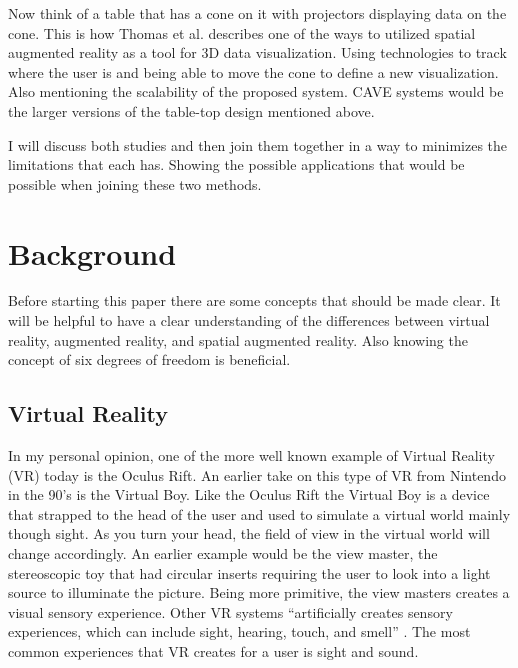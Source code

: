 \documentclass{sig-alternate}
\begin{document}
Now think of a table that has a cone on it with projectors displaying data on the cone. This is how Thomas et al. describes one of the ways to utilized spatial augmented reality as a tool for 3D data visualization. Using technologies to track where the user is and being able to move the cone to define a new visualization. Also mentioning the scalability of the proposed system. CAVE systems would be the larger versions of the table-top design mentioned above.      

I will discuss both studies and then join them together in a way to minimizes the limitations that each has. Showing the possible applications that would be possible when joining these two methods.       


\section{Background}
\label{sec:background} 
Before starting this paper there are some concepts that should be made clear. It will be helpful to have a clear understanding of the differences between virtual reality, augmented reality, and spatial augmented reality. Also knowing the concept of six degrees of freedom is beneficial.  

\subsection{Virtual Reality}
\label{sec:Virtual Reality}
In my personal opinion, one of the more well known example of Virtual Reality (VR) today is the Oculus Rift. An earlier take on this type of VR from Nintendo in the 90's is the Virtual Boy. Like the Oculus Rift the Virtual Boy is a device that strapped to the head of the user and used to simulate a virtual world mainly though sight. As you turn your head, the field of view in the virtual world will change accordingly. An earlier example would be the view master, the stereoscopic toy that had circular inserts requiring the user to look into a light source to illuminate the picture. Being more primitive, the view masters creates a visual sensory experience. Other VR systems ``artificially creates sensory experiences, which can include sight, hearing, touch, and smell'' \cite{VR}. The most common experiences that VR creates for a user is sight and sound.       
\end{document}

